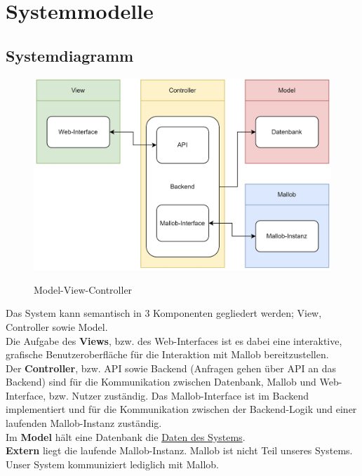 \section{Systemmodelle}

\subsection{Systemdiagramm}

\begin{figure}[H]
    \centering
    \includegraphics[width=\textwidth]{images-interface/Diagramme/Systemdiagramm3.jpg} \\
    \caption{\gls{Model-View-Controller}}
\end{figure}
Das System kann semantisch in 3 Komponenten gegliedert werden; View, Controller sowie Model. \\
Die Aufgabe des \textbf{Views}, bzw. des Web-Interfaces ist es dabei eine interaktive, grafische Benutzeroberfläche für die Interaktion mit Mallob bereitzustellen. \\
Der \textbf{Controller}, bzw. \gls{API} sowie Backend (Anfragen gehen über \gls{API} an das Backend) sind für die Kommunikation zwischen \gls{Datenbank}, Mallob und \gls{Web-Interface}, bzw. \gls{Nutzer} zuständig. Das Mallob-Interface ist im Backend implementiert und für die Kommunikation zwischen der Backend-Logik und einer laufenden Mallob-Instanz zuständig.\\
Im \textbf{Model} hält eine \gls{Datenbank} die \hyperref[PD]{Daten des Systems}. \\
\textbf{Extern} liegt die laufende Mallob-Instanz. Mallob ist nicht Teil unseres Systems. Unser System kommuniziert lediglich mit Mallob.

